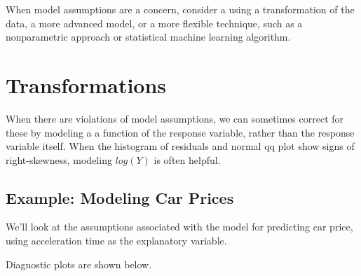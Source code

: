 \documentclass[
  letterpaper,
  DIV=11,
  numbers=noendperiod]{scrreprt}
\begin{document}
When model assumptions are a concern, consider a using a transformation
of the data, a more advanced model, or a more flexible technique, such
as a nonparametric approach or statistical machine learning algorithm.

\section{Transformations}\label{transformations}

When there are violations of model assumptions, we can sometimes correct
for these by modeling a a function of the response variable, rather than
the response variable itself. When the histogram of residuals and normal
qq plot show signs of right-skewness, modeling \(log(Y)\) is often
helpful.

\subsection{Example: Modeling Car
Prices}\label{example-modeling-car-prices}

We'll look at the assumptions associated with the model for predicting
car price, using acceleration time as the explanatory variable.

Diagnostic plots are shown below.
\end{document}
